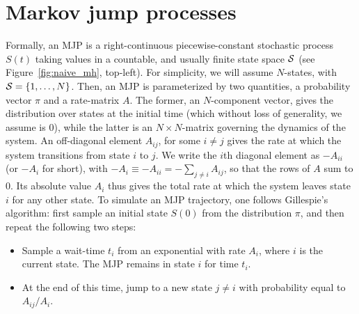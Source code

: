 \section{Markov jump processes}
Formally, an MJP is a right-continuous piecewise-constant stochastic
process $S(t)$ taking values in a countable, and usually finite state
space ${\mathcal S}$ (see Figure~\ref{fig:naive_mh}, top-left).
For simplicity, we will assume $N$-states, with ${\mathcal S} = \{1,\ldots,N\}$. Then, 
an MJP is parameterized by two quantities, a probability vector $\pi$ and a 
rate-matrix $A$. The former, an $N$-component vector, gives the 
distribution over states at the initial time (which without loss of 
generality, we assume is $0$), while the latter is an 
$N \times N$-matrix governing the dynamics of the system.  An 
off-diagonal element $A_{ij}$, for some $i \neq j$ gives the rate at 
which the system transitions from state $i$ to $j$. We write the 
$i$th diagonal element as $-A_{ii}$ (or $-A_i$ for short), with
$-A_i \equiv -A_{ii} = -\sum_{j \neq i} A_{ij}$, 
so that the rows of $A$ sum to $0$.  Its absolute value $A_i$ thus gives
the total rate at which the system leaves state $i$ for any other state.
To simulate an MJP trajectory, one follows Gillespie's algorithm: 
first sample an initial state $S(0)$ from the distribution $\pi$, and
then repeat the following two steps:
\begin{itemize}
  \item Sample a wait-time $t_i$ from an exponential with rate $A_i$, where
    $i$ is the current state. The MJP remains in state $i$ for time $t_i$.
  \item At the end of this time, jump to a new state $j \neq i$ with 
    probability equal to $A_{ij}/A_i$.
\end{itemize}


